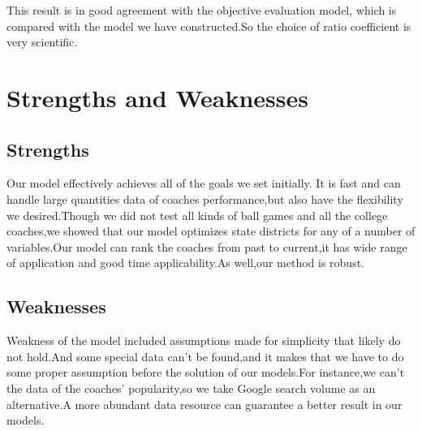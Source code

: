 \documentclass{mcmthesis}
\begin{document}
\par This result is in good agreement with the objective evaluation model, which is compared with the model we have constructed.So the choice of ratio coefficient is very scientific.

\section{Strengths and Weaknesses}

\subsection{Strengths}
\par Our model effectively achieves all of the goals we set initially. It is fast and can handle large quantities data of coaches performance,but also have the flexibility we desired.Though we did not test all kinds of ball games and all the college coaches,we showed that our model optimizes state districts for any of a number of variables.Our model can rank the coaches from past to current,it has wide range of application and good time applicability.As well,our method is robust.

\subsection{Weaknesses}
\par Weakness of the model included assumptions made for simplicity that likely do not hold.And some special data can't be found,and it makes that we have to do some proper assumption before the solution of our models.For instance,we can't the data of the coaches' popularity,so we take  Google search volume as an alternative.A more abundant data resource can guarantee a better result in our models.
\end{document}
